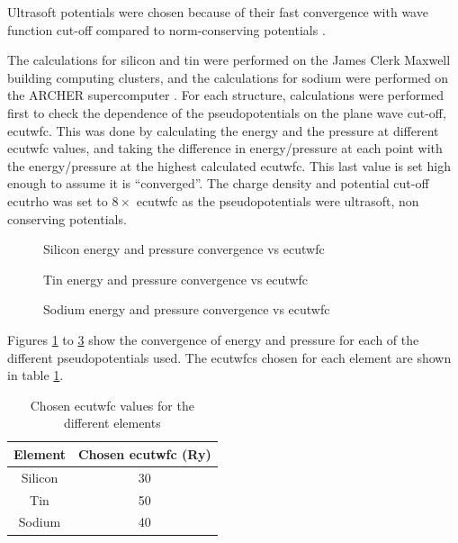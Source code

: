 \documentclass[12pt]{article}
\begin{document}
Ultrasoft potentials were chosen because of their fast convergence with wave function cut-off compared to norm-conserving potentials \cite{vanderbilt1990soft}. 

The calculations for silicon and tin were performed on the James Clerk Maxwell building computing clusters, and the calculations for sodium were performed on the ARCHER supercomputer \cite{archer}.
For each structure, calculations were performed first to check the dependence of the pseudopotentials on the plane wave cut-off, ecutwfc. This was done by calculating the energy and the pressure at different ecutwfc values, and taking the difference in energy/pressure at each point with the energy/pressure at the highest calculated ecutwfc. This last value is set high enough to assume it is ``converged''. 
The charge density and potential cut-off ecutrho was set to $8\times$ ecutwfc as the pseudopotentials were ultrasoft, non conserving potentials.

\begin{figure}
	\centering
	\subfloat{
		
}\qquad
\subfloat{
		
}\qquad
\caption{Silicon energy and pressure convergence vs ecutwfc}
\label{fig:silicon_ecut_convergence}
\end{figure}
\begin{figure}
	\centering
	\subfloat{
		
}\qquad
\subfloat{
		
}\qquad
\caption{Tin energy and pressure convergence vs ecutwfc}
\label{fig:tin_ecut_convergence}
\end{figure}
\begin{figure}
	\centering
	\subfloat{
		
}\qquad
\subfloat{
		
}\qquad
\caption{Sodium energy and pressure convergence vs ecutwfc}
\label{fig:sodium_ecut_convergence}
\end{figure}

Figures \ref{fig:silicon_ecut_convergence} to \ref{fig:sodium_ecut_convergence} show the convergence of energy and pressure for each of the different pseudopotentials used.
The ecutwfcs chosen for each element are shown in table \ref{tab:chosenecuts}.

\begin{table}
\centering
	\begin{tabular}{|c|c|}
\hline
Element & Chosen ecutwfc (Ry)\\
\hline
Silicon &  30\\
Tin &  50\\
Sodium &  40\\
\hline
\end{tabular}
\caption{Chosen ecutwfc values for the different elements}
\label{tab:chosenecuts}
\end{table}
\end{document}
